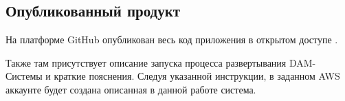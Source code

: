 \clearpage

\subsection{Опубликованный продукт}
На платформе GitHub опубликован весь код приложения в открытом доступе \cite{MySourceCode}. 

Также там присутствует описание запуска процесса развертывания DAM-Системы и краткие пояснения. Следуя указанной инструкции, в заданном AWS аккаунте будет создана описанная в данной работе система.